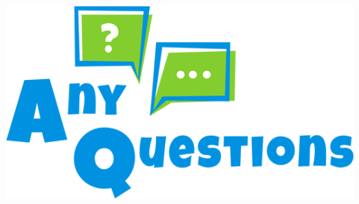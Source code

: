 \documentclass[pdflatex,compress]{beamer}
\begin{document}
\begin{frame}
	\begin{center}
		\includegraphics[width=\linewidth]{../../../img/any_questions.png}
	\end{center}
\end{frame}
\end{document}

